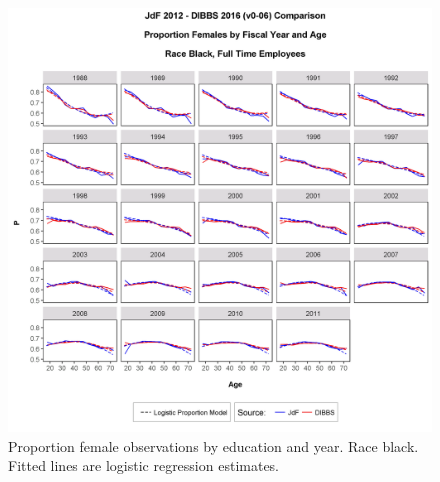 \documentclass[10pt, letterpaper]{article}
\begin{document}
\begin{spacing}{1.0}
\begin{figure}[h]
    \centering
    \includegraphics[width=6.5in, trim={0 0 0 1in}, clip]{GenderProportionLogisticModelFYRaceAgeCv0-06.png}
    \caption{Proportion female observations by education and year.  Race black.  Fitted lines are logistic regression estimates.}
    \label{figure:GenderProportionLogisticModelFYRaceAgeC}
\end{figure}

\clearpage


\end{spacing}
\end{document}
